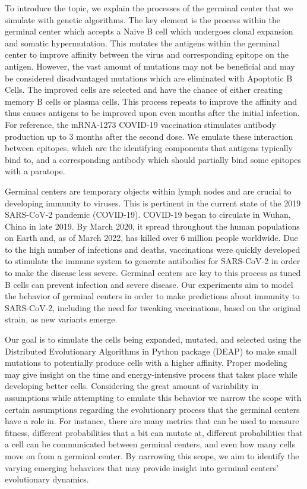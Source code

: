\documentclass[conference]{IEEEtran}
\begin{document}
To introduce the topic, we explain the processes of the germinal center that we simulate with genetic algorithms. The key element is the process within the germinal center which accepts a Naive B cell which undergoes clonal expansion and somatic hypermutation. This mutates the antigens within the germinal center to improve affinity between the virus and corresponding epitope on the antigen. However, the vast amount of mutations may not be beneficial and may be considered disadvantaged mutations which are eliminated with Apoptotic B Cells. The improved cells are selected and have the chance of either creating memory B cells or plasma cells. This process repeats to improve the affinity and thus causes antigens to be improved upon even months after the initial infection. For reference, the mRNA-1273 COVID-19 vaccination stimulates antibody production up to 3 months after the second dose. \cite{vaxlast} We emulate these interaction between epitopes, which are the identifying components that antigens typically bind to, and a corresponding antibody which should partially bind some epitopes with a paratope.

Germinal centers are temporary objects within lymph nodes and are crucial to developing immunity to viruses. This is pertinent in the current state of the 2019 SARS-CoV-2 pandemic (COVID-19).  COVID-19 began to circulate in Wuhan, China in late 2019. By March 2020, it spread throughout the human populations on Earth and, as of March 2022, has killed over 6 million people worldwide. \cite{b6}    Due to the high number of infections and deaths, vaccinations were quickly developed to stimulate the immune system to generate antibodies for SARS-CoV-2 in order to make the disease less severe. Germinal centers are key to this process as tuned B cells can prevent infection and severe disease. Our experiments aim to model the behavior of germinal centers in order to make predictions about immunity to SARS-CoV-2, including the need for tweaking vaccinations, based on the original strain, as new variants emerge. 

Our goal is to simulate the cells being expanded, mutated, and selected using the Distributed Evolutionary Algorithms in Python package (DEAP) \cite{deap} to make small mutations to potentially produce cells with a higher affinity. Proper modeling may give insight on the time and energy-intensive process that takes place while developing better cells. Considering the great amount of variability in assumptions while attempting to emulate this behavior we narrow the scope with certain assumptions regarding the evolutionary process that the germinal centers have a role in. For instance, there are many metrics that can be used to measure fitness, different probabilities that a bit can mutate at, different probabilities that a cell can be communicated between germinal centers, and even how many cells move on from a germinal center. By narrowing this scope, we aim to identify the varying emerging behaviors that may provide insight into germinal centers' evolutionary dynamics.    
\end{document}
